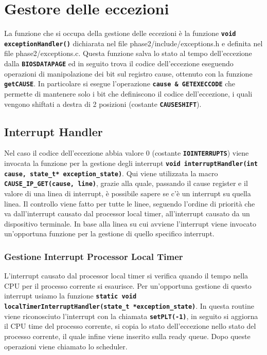 \documentclass{article}
\begin{document}
\newpage
\section{Gestore delle eccezioni}
La funzione che si occupa della gestione delle eccezioni è la funzione \texttt{\textbf{void exceptionHandler()}} dichiarata 
nel file phase2/include/exceptions.h e definita nel file phase2/exceptions.c. Questa funzione salva lo stato al tempo dell'eccezione dalla \texttt{\textbf{BIOSDATAPAGE}} ed in seguito trova il codice dell'eccezione eseguendo operazioni di manipolazione dei bit sul registro cause, ottenuto con la funzione \texttt{\textbf{getCAUSE}}. In particolare si esegue l'operazione 
\texttt{\textbf{cause \& GETEXECCODE}} che permette di mantenere solo i bit che definiscono il codice dell'eccezione, i quali vengono shiftati a destra di 2 posizioni (costante \texttt{\textbf{CAUSESHIFT}}). 
\subsection{Interrupt Handler}
Nel caso il codice dell'eccezione abbia valore 0 (costante \texttt{\textbf{IOINTERRUPTS}}) viene invocata la funzione per la 
gestione degli interrupt \texttt{\textbf{void interruptHandler(int cause, state\_t* exception\_state)}}. Qui viene 
utilizzata la macro \texttt{\textbf{CAUSE\_IP\_GET(cause, line)}}, grazie alla quale, passando il cause register e il 
valore di una linea di interrupt, è possibile sapere se c'è un interrupt su quella linea. Il controllo viene fatto per tutte 
le linee, seguendo l'ordine di priorità che va dall'interrupt causato dal processor local timer, all'interrupt causato da un 
dispositivo terminale. In base alla linea su cui avviene l'interrupt viene invocato un'opportuna funzione per la gestione 
di quello specifico interrupt.
\subsubsection{Gestione Interrupt Processor Local Timer}
L'interrupt causato dal processor local timer si verifica quando il tempo nella CPU per il processo corrente si esaurisce. 
Per un'opportuna gestione di questo interrupt usiamo la funzione \texttt{\textbf{static void localTimerInterruptHandler(state\_t *exception\_state)}}. In questa routine viene riconosciuto l'interrupt con la chiamata \texttt{\textbf{setPLT(-1)}}, 
in seguito si aggiorna il CPU time del processo corrente, si copia lo stato dell'eccezione nello stato del processo corrente, il quale infine viene inserito sulla ready queue. Dopo queste operazioni viene chiamato lo scheduler.
\end{document}
